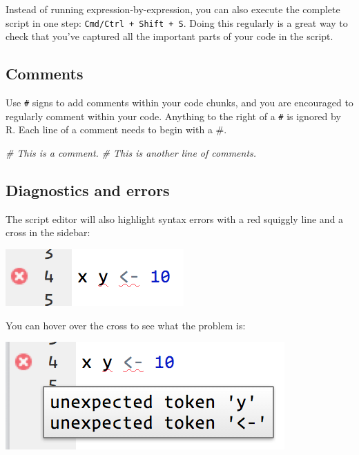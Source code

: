 \documentclass[]{book}
\newenvironment{Shaded}{\begin{snugshade}}{\end{snugshade}}
\newcommand{\CommentTok}[1]{\textcolor[rgb]{0.56,0.35,0.01}{\textit{#1}}}
\begin{document}
Instead of running expression-by-expression, you can also execute the
complete script in one step: \texttt{Cmd/Ctrl\ +\ Shift\ +\ S}. Doing
this regularly is a great way to check that you've captured all the
important parts of your code in the script.

\subsection{Comments}\label{comments}

Use \texttt{\#} signs to add comments within your code chunks, and you
are encouraged to regularly comment within your code. Anything to the
right of a \texttt{\#} is ignored by R. Each line of a comment needs to
begin with a \#.

\begin{Shaded}
\begin{Highlighting}[]
\CommentTok{# This is a comment.}
\CommentTok{# This is another line of comments.}
\end{Highlighting}
\end{Shaded}

\subsection{Diagnostics and errors}\label{diagnostics-and-errors}

The script editor will also highlight syntax errors with a red squiggly
line and a cross in the sidebar:

\begin{center}\includegraphics[width=0.7\linewidth]{img/rstudio-diagnostic} \end{center}

You can hover over the cross to see what the problem is:

\begin{center}\includegraphics[width=0.7\linewidth]{img/rstudio-diagnostic-tip} \end{center}
\end{document}
